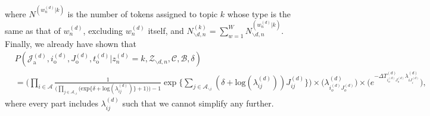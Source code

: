 \documentclass[a4paper]{article}
\begin{document}
 where $N^{(w_n^{(d)}|k)}$ is the number of tokens assigned to topic $k$ whose type is the same as that of $w_n^{(d)}$, excluding $w_n^{(d)}$ itself, and $N^{(k)}_{\backslash d, n}=\sum_{w=1}^W N_{\backslash d, n}^{(w_n^{(d)}|k)}$. Finally, we already have shown that
 \begin{equation}
 \begin{aligned}
& P(\mathcal{J}^{(d)}_{\mbox{a}}, i^{(d)}_{\mbox{o}}, J^{(d)}_{\mbox{o}}, t^{(d)}_{\mbox{o}}| z^{(d)}_n=k, \mathcal{Z}_{\backslash d, n}, \mathcal{C}, \mathcal{B}, \delta)\\&=\Big( \prod_{i\in \mathcal{A}}\frac{1}{\Big(\prod_{j \in \mathcal{A}_{\backslash i}} \Big(\mbox{exp}\{\delta+\mbox{log}(\lambda_{ij}^{(d)})\} + 1\Big)\Big)-1}\exp\Big\{\sum_{j \in \mathcal{A}_{\backslash i}} (\delta+\mbox{log}(\lambda_{ij}^{(d)}))J_{ij}^{(d)} \Big\}\Big)\times \Big(\lambda^{(d)}_{i_o^{(d)}J_{o}^{(d)}}\Big)\times \Big(e^{-\Delta T^{(d)}_{i_o^{(d)}J_o^{(d)}}\lambda^{(d)}_{iJ^{(d)}_{i}}}\Big),
 \end{aligned}
 \end{equation}
 where every part includes $\lambda_{ij}^{(d)}$ such that we cannot simplify any further.\\ 
 
\end{document}
